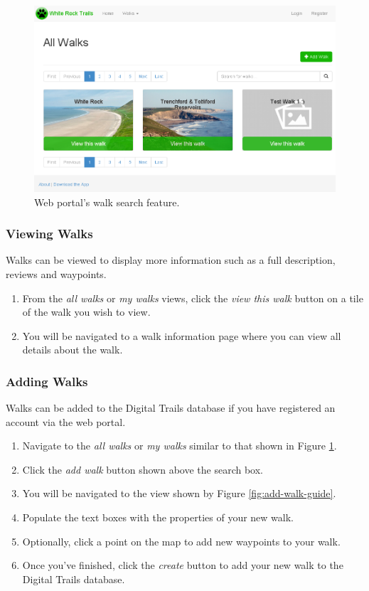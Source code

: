 \documentclass[11pt,a4paper]{report}
\begin{document}
\begin{figure}[H]
\centering
\includegraphics[width=0.8\linewidth]{./img/webportal/all-walks}
\caption{Web portal's walk search feature.}
\label{fig:all-walks-guide}
\end{figure}

\subsubsection{Viewing Walks}

Walks can be viewed to display more information such as a full description, reviews and waypoints.

\begin{enumerate}
\item From the \emph{all walks} or \emph{my walks} views, click the \emph{view this walk} button on a tile of the walk you wish to view.
\item You will be navigated to a walk information page where you can view all details about the walk.
\end{enumerate}

\subsubsection{Adding Walks}

Walks can be added to the Digital Trails database if you have registered an account via the web portal.

\begin{enumerate}
\item Navigate to the \emph{all walks} or \emph{my walks} similar to that shown in Figure \ref{fig:all-walks-guide}.
\item Click the \emph{add walk} button shown above the search box.
\item You will be navigated to the view shown by Figure \ref{fig:add-walk-guide}.
\item Populate the text boxes with the properties of your new walk.
\item Optionally, click a point on the map to add new waypoints to your walk.
\item Once you've finished, click the \emph{create} button to add your new walk to the Digital Trails database.
\end{enumerate}
\end{document}
